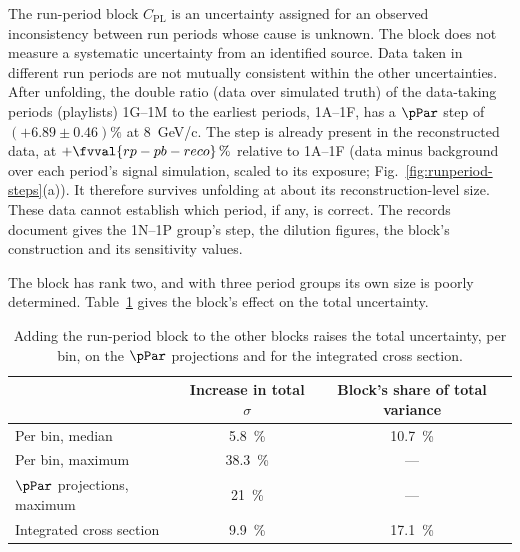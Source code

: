 The run-period block $C_{\mathrm{PL}}$ is an uncertainty assigned for an observed inconsistency between run periods whose cause is unknown. The block does not measure a systematic uncertainty from an identified source. Data taken in different run periods are not mutually consistent within the other uncertainties. After unfolding, the double ratio (data over simulated truth) of the data-taking periods (playlists) 1G--1M to the earliest periods, 1A--1F, has a $\pPar$ step of $(+6.89\pm0.46)\%$ at \SI{8}{GeV/c}. The step is already present in the reconstructed data, at $+\fvval{rp-pb-reco}\,\%$ relative to 1A--1F (data minus background over each period's signal simulation, scaled to its exposure; Fig.~\ref{fig:runperiod-steps}(a)). It therefore survives unfolding at about its reconstruction-level size. These data cannot establish which period, if any, is correct. The records document gives the 1N--1P group's step, the dilution figures, the block's construction and its sensitivity values.

The block has rank two, and with three period groups its own size is poorly determined. Table~\ref{tab:pl-added} gives the block's effect on the total uncertainty.

\begin{table}[htbp]
  \caption[Effect of the run-period block on the 2D uncertainty]{Adding the run-period block to the other blocks raises the total uncertainty, per bin, on the $\pPar$ projections and for the integrated cross section.}
  \label{tab:pl-added}
  \centering
  \begin{tabular}{@{}lcc@{}}
    \toprule
    & Increase in total $\sigma$ & Block's share of total variance \\
    \midrule
    Per bin, median & \SI{5.8}{\percent} & \SI{10.7}{\percent} \\ %
    Per bin, maximum & \SI{38.3}{\percent} & --- \\ %
    $\pPar$ projections, maximum & \SI{21}{\percent} & --- \\
    Integrated cross section & \SI{9.9}{\percent} & \SI{17.1}{\percent} \\
    \bottomrule
  \end{tabular}
\end{table}

